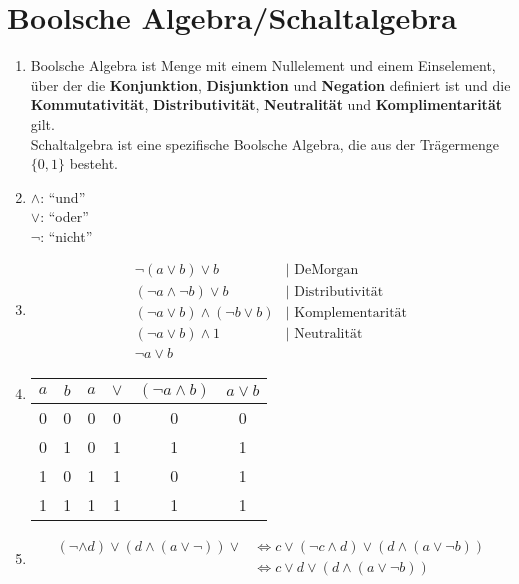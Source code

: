 \documentclass{gadsescript}
\begin{document}
\maketitle

\section{Boolsche Algebra/Schaltalgebra}
\begin{enumerate}[label=\alph*)]
	\item Boolsche Algebra ist Menge mit einem Nullelement und einem Einselement, über der die \textbf{Konjunktion}, \textbf{Disjunktion} und \textbf{Negation} definiert ist und die \textbf{Kommutativität}, \textbf{Distributivität}, \textbf{Neutralität} und \textbf{Komplimentarität} gilt.\\
		Schaltalgebra ist eine spezifische Boolsche Algebra, die aus der Trägermenge $ \{ 0, 1 \} $ besteht.
	\item $\wedge$: ``und''\\
		$\vee$: ``oder''\\
		$\neg$: ``nicht''\\
	\item
		\begin{align*}
			\neg \left( a \vee b \right) \vee b &\mid \text{ DeMorgan}\\
			(\neg a \wedge \neg b) \vee b &\mid \text{ Distributivität}\\
			(\neg a \vee b) \wedge (\neg b \vee b) &\mid \text{ Komplementarität}\\
			(\neg a \vee b) \wedge 1 &\mid \text{ Neutralität}\\
			\neg a \vee b
		\end{align*}
	\item
		\begin{tabular}{cc|| c|c|c ||c}
			$ a $ & $ b $ & $ a $ & $ \vee $ & $ ( \neg a \wedge b ) $ & $ a \vee b $\\\hline
			0 & 0 & 0 & 0 & 0 & 0\\
			0 & 1 & 0 & 1 & 1 & 1\\
			1 & 0 & 1 & 1 & 0 & 1\\
			1 & 1 & 1 & 1 & 1 & 1
		\end{tabular}
	\item
		\begin{align*}
			( \neg \wedge d ) \vee ( d \wedge ( a \vee \neg )) \vee &\iff c \vee ( \neg c \wedge d ) \vee ( d \wedge ( a \vee \neg b ))\\
			&\iff c \vee d \vee ( d \wedge ( a \vee \neg b))\\

\end{align*}
\end{enumerate}
\end{document}
